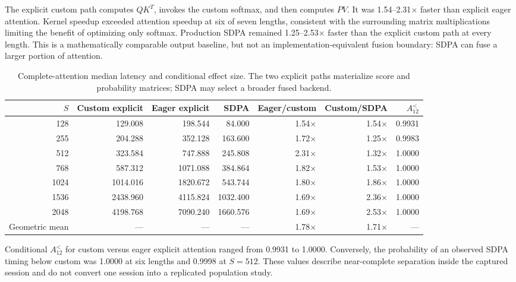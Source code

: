 \documentclass[twoside,twocolumn,10pt]{article}
\begin{document}
The explicit custom path computes $QK^T$, invokes the custom softmax, and then
computes $PV$. It was 1.54--2.31$\times$ faster than explicit eager attention.
Kernel speedup exceeded attention speedup at six of seven lengths, consistent
with the surrounding matrix multiplications limiting the benefit of optimizing
only softmax. Production SDPA remained 1.25--2.53$\times$ faster than the
explicit custom path at every length. This is a mathematically comparable
output baseline, but not an implementation-equivalent fusion boundary: SDPA can
fuse a larger portion of attention.

\begin{table}[t]
\centering
\caption{Complete-attention median latency and conditional effect size. The
two explicit paths materialize score and probability matrices; SDPA may select
a broader fused backend.}
\label{tab:attention}
\small
\setlength{\tabcolsep}{5pt}
\begin{tabular}{rrrrrrr}
\toprule
$S$ & Custom explicit & Eager explicit & SDPA & Eager/custom & Custom/SDPA & $A_{12}^{<}$ \\
\midrule
128  & 129.008  & 198.544  & 84.000   & 1.54$\times$ & 1.54$\times$ & 0.9931 \\
255  & 204.288  & 352.128  & 163.600  & 1.72$\times$ & 1.25$\times$ & 0.9983 \\
512  & 323.584  & 747.888  & 245.808  & 2.31$\times$ & 1.32$\times$ & 1.0000 \\
768  & 587.312  & 1071.088 & 384.864  & 1.82$\times$ & 1.53$\times$ & 1.0000 \\
1024 & 1014.016 & 1820.672 & 543.744  & 1.80$\times$ & 1.86$\times$ & 1.0000 \\
1536 & 2438.960 & 4115.824 & 1032.400 & 1.69$\times$ & 2.36$\times$ & 1.0000 \\
2048 & 4198.768 & 7090.240 & 1660.576 & 1.69$\times$ & 2.53$\times$ & 1.0000 \\
\midrule
Geometric mean & --- & --- & --- & 1.78$\times$ & 1.71$\times$ & --- \\
\bottomrule
\end{tabular}
\end{table}

Conditional $A_{12}^{<}$ for custom versus eager explicit attention ranged
from 0.9931 to 1.0000. Conversely, the probability of an observed SDPA timing
below custom was 1.0000 at six lengths and 0.9998 at $S=512$. These values
describe near-complete separation inside the captured session and do not
convert one session into a replicated population study.
\end{document}
